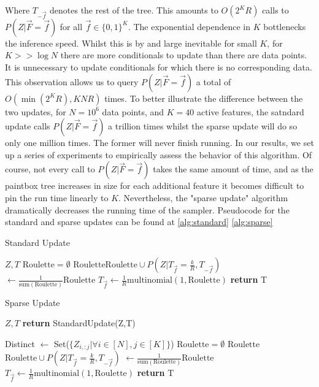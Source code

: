 \documentclass{article}
\begin{document}
Where $T_{-\vec{f}}$ denotes the rest of the tree.  This amounts to $O(2^KR)$ calls to $P(Z|\vec{F} = \vec{f})$ for all $\vec{f} \in \{0,1\}^K$. The exponential dependence in $K$ bottlenecks the inference speed.  Whilst this is by and large inevitable for small $K$, for $K >> \log N$ there are more conditionals to update than there are data points.  It is unnecessary to update conditionals for which there is no corresponding data.  This observation allows us to query $P(Z|\vec{F} = \vec{f})$ a total of $O(\min(2^KR),KNR)$ times.  To better illustrate the difference between the two updates, for $N = 10^6$ data points, and $K=40$ active features, the satndard update calls $P(Z|\vec{F} = \vec{f})$ a trillion times whilst the sparse update will do so only one million times.  The former will never finish running.  In our results, we set up a series of experiments to empirically assess the behavior of this algorithm.  Of course, not every call to $P(Z|\vec{F} = \vec{f})$ takes the same amount of time, and as the paintbox tree increases in size for each additional feature it becomes difficult to pin the run time linearly to $K$.  Nevertheless, the "sparse update" algorithm dramatically decreases the running time of the sampler.  Pseudocode for the standard and sparse updates can be found at \ref{alg:standard} \ref{alg:sparse}


\begin{algorithm}[tb]
   \caption{Standard Update}
   \label{alg:standard}
\begin{algorithmic}
    $Z,T$
   \STATE $\text{Roulette} = \emptyset$
   \STATE $\text{Roulette} $\leftarrow$ \text{Roulette} \cup P(Z|T_{\vec{f}}=\frac{k}{R},T_{-\vec{f}})$
   \ENDFOR
   \STATE {} $\leftarrow \frac{1}{\text{sum}(\text{Roulette})}\text{Roulette}$
   \STATE $T_{\vec{f}} \leftarrow \frac{1}{R}\text{multinomial}(1,\text{Roulette})$
   \ENDFOR
   \ENDFOR
   \STATE \textbf{return} T
\end{algorithmic}
\end{algorithm}

\begin{algorithm}[tb]
   \caption{Sparse Update}
   \label{alg:sparse}
\begin{algorithmic}
    $Z,T$
        \STATE \textbf{return} StandardUpdate(Z,T)
    
   \ENDIF
   \STATE Distinct $\leftarrow$ Set($\{Z_{i,:j} |\forall i \in [N],j\in [K]\}$)
   \STATE $\text{Roulette} = \emptyset$
   \STATE $\text{Roulette} $\leftarrow$ \text{Roulette} \cup P(Z|T_{\vec{f}}=\frac{k}{R},T_{-\vec{f}})$
   \ENDFOR
   \STATE {} $\leftarrow \frac{1}{\text{sum}(\text{Roulette})}\text{Roulette}$
   \STATE $T_{\vec{f}} \leftarrow \frac{1}{R}\text{multinomial}(1,\text{Roulette})$
   \ENDFOR
   \STATE \textbf{return} T
\end{algorithmic}
\end{algorithm}
\end{document}

